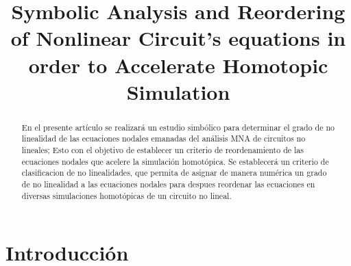 \documentclass[conference,letterpaper,onecolumn]{IEEEtran}
\begin{document}
\title{Symbolic Analysis and Reordering of Nonlinear Circuit's equations in order to Accelerate Homotopic Simulation}

\author{
\and
{}
\and
{}
\and
{}
}


\maketitle

\begin{abstract}
En el presente art{\'i}culo se realizar\'a un estudio simb\'olico para determinar el grado de no linealidad de las ecuaciones nodales emanadas del an\'alisis MNA de circuitos no lineales;
Esto con el objetivo de establecer un criterio de reordenamiento de las ecuaciones nodales que acelere la simulaci\'on homot\'opica. Se establecer\'a
un criterio de clasificacion de no linealidades, que permita de asignar de manera num\'erica un grado de no linealidad a las ecuaciones nodales para despues reordenar las ecuaciones en
diversas simulaciones homot\'opicas de un circuito no lineal.
\end{abstract}

\section{Introducci\'on}
\end{document}
